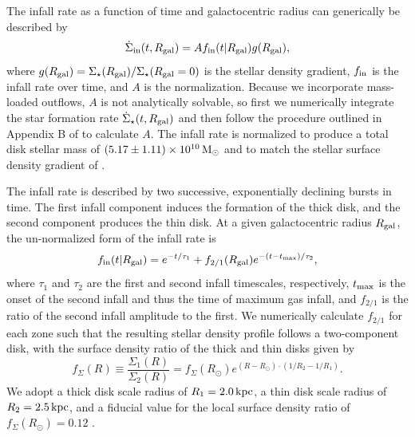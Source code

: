 \documentclass[twocolumn,twocolappendix,linenumbers]{aastex631}
\newcommand{\kpc}{\,{\rm kpc}}
\begin{document}
The infall rate as a function of time and galactocentric radius can generically be described by
\begin{equation}
    \label{eq:infall-rate}
    \dot\Sigma_{\rm in}(t,R_{\rm gal}) = A f_{\rm in}(t|R_{\rm gal}) g(R_{\rm gal}),
\end{equation}
where $g(R_{\rm gal})=\Sigma_\star(R_{\rm gal}) / \Sigma_\star(R_{\rm gal}=0)$ is the stellar density gradient, $f_{\rm in}$ is the infall rate over time, and $A$ is the normalization. Because we incorporate mass-loaded outflows, $A$ is not analytically solvable, so first we numerically integrate the star formation rate $\dot\Sigma_\star(t,R_{\rm gal})$ and then follow the procedure outlined in Appendix B of \citet{johnson_stellar_2021} to calculate $A$. The infall rate is normalized to produce a total disk stellar mass of $(5.17\pm1.11)\times 10^{10}\,{\rm M}_\odot$ \citep{licquia_improved_2015} and to match the stellar surface density gradient of \citet{bland-hawthorn_galaxy_2016}.

The infall rate is described by two successive, exponentially declining bursts in time. The first infall component induces the formation of the thick disk, and the second component produces the thin disk. At a given galactocentric radius $R_{\rm gal}$, the un-normalized form of the infall rate is
\begin{equation}
    \label{eq:twoinfall-ifr}
    f_{\rm in}(t|R_{\rm gal}) = e^{-t/\tau_1} + f_{2/1}(R_{\rm gal}) e^{-(t-t_{\rm max})/\tau_2},
\end{equation}
where $\tau_1$ and $\tau_2$ are the first and second infall timescales, respectively, $t_{\rm max}$ is the onset of the second infall and thus the time of maximum gas infall, and $f_{2/1}$ is the ratio of the second infall amplitude to the first. We numerically calculate $f_{2/1}$ for each zone such that the resulting stellar density profile follows a two-component disk, with the surface density ratio of the thick and thin disks given by
\begin{equation}
    f_\Sigma(R) \equiv \frac{\Sigma_1(R)}{\Sigma_2(R)} = f_\Sigma(R_\odot) e^{(R-R_\odot)\cdot(1/R_2 - 1/R_1)}.
\end{equation}
We adopt a thick disk scale radius of $R_1=2.0\kpc$, a thin disk scale radius of $R_2=2.5\kpc$, and a fiducial value for the local surface density ratio of $f_\Sigma(R_\odot)=0.12$ \citep{bland-hawthorn_galaxy_2016}. 
\end{document}
